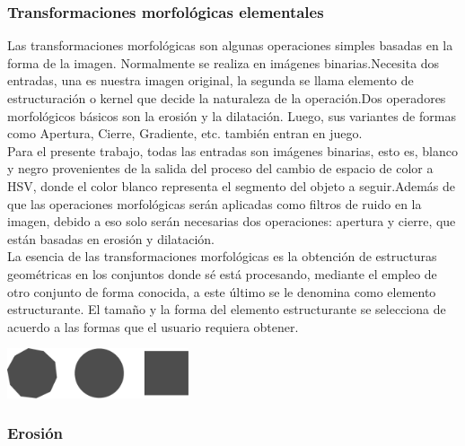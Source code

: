 \subsubsection{Transformaciones morfológicas elementales}
Las transformaciones morfológicas son algunas operaciones simples basadas en la forma de la imagen. Normalmente se realiza en 
imágenes binarias.Necesita dos entradas, una es nuestra imagen original, la segunda se llama elemento de estructuración o 
kernel que decide la naturaleza de la operación.Dos operadores morfológicos básicos son la erosión y la dilatación. Luego, 
sus variantes de formas como Apertura, Cierre, Gradiente, etc. también entran en juego. \cite{ieeeucsa2019}\\
Para el presente trabajo, todas las entradas son imágenes binarias, esto es, blanco y negro provenientes de la salida
del proceso del cambio de espacio de color a HSV, donde el color blanco representa el segmento del objeto a seguir.Además de que
las operaciones morfológicas serán aplicadas como filtros de ruido en la imagen, debido a eso solo serán necesarias dos operaciones:
apertura y cierre, que están basadas en erosión y dilatación.\\
La esencia de las transformaciones morfológicas es la obtención de estructuras geométricas en los conjuntos donde sé está procesando,
mediante el empleo de otro conjunto de forma conocida, a este último se le denomina como elemento estructurante.
El tamaño y la forma del elemento estructurante se selecciona de acuerdo a las formas que el usuario requiera obtener.
\begin{center}
    \includegraphics[width=0.4\textwidth]{Capitulo2/Fig13.eps}
    \label{Fig13}
\end{center}


\subsubsection{Erosión}
